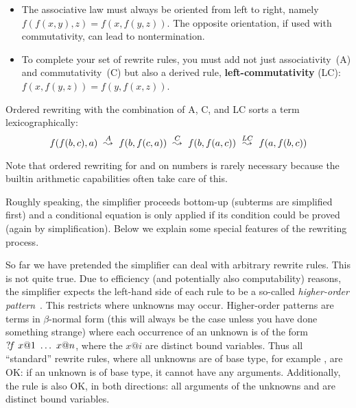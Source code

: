 \begin{isabellebody}
\begin{isamarkuptext}
\begin{itemize}
\item The associative law must always be oriented from left to right,
  namely $f(f(x,y),z) = f(x,f(y,z))$.  The opposite orientation, if
  used with commutativity, can lead to nontermination.

\item To complete your set of rewrite rules, you must add not just
  associativity~(A) and commutativity~(C) but also a derived rule, {\bf
    left-com\-mut\-ativ\-ity} (LC): $f(x,f(y,z)) = f(y,f(x,z))$.
\end{itemize}
Ordered rewriting with the combination of A, C, and LC sorts a term
lexicographically:
\[\def\maps#1{~\stackrel{#1}{\leadsto}~}
 f(f(b,c),a) \maps{A} f(b,f(c,a)) \maps{C} f(b,f(a,c)) \maps{LC} f(a,f(b,c)) \]

Note that ordered rewriting for \isa{{\isacharplus}} and \isa{{\isacharasterisk}} on numbers is rarely
necessary because the builtin arithmetic capabilities often take care of
this.%
\end{isamarkuptext}%
%
%
\begin{isamarkuptext}%
\label{sec:SimpHow}
Roughly speaking, the simplifier proceeds bottom-up (subterms are simplified
first) and a conditional equation is only applied if its condition could be
proved (again by simplification). Below we explain some special features of the rewriting process.%
\end{isamarkuptext}%
%
%
\begin{isamarkuptext}%
So far we have pretended the simplifier can deal with arbitrary
rewrite rules. This is not quite true.  Due to efficiency (and
potentially also computability) reasons, the simplifier expects the
left-hand side of each rule to be a so-called \emph{higher-order
pattern}~\cite{nipkow-patterns}. This restricts where
unknowns may occur.  Higher-order patterns are terms in $\beta$-normal
form (this will always be the case unless you have done something
strange) where each occurrence of an unknown is of the form
${?\!f}~x@1~\dots~x@n$, where the $x@i$ are distinct bound
variables. Thus all ``standard'' rewrite rules, where all unknowns are
of base type, for example , are OK: if an unknown is
of base type, it cannot have any arguments. Additionally, the rule
 is also OK, in
both directions: all arguments of the unknowns  and
 are distinct bound variables.


\end{isamarkuptext}
\end{isabellebody}
